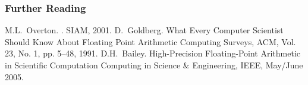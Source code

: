 \documentclass[mathserif,handout]{beamer}
\begin{document}
\begin{frame}[allowframebreaks]
  \frametitle<presentation>{Further Reading}    
  \begin{thebibliography}{10}    
  \beamertemplatebookbibitems
   M.L.~Overton.
    .
   \newblock SIAM, 2001.
    \beamertemplatearticlebibitems
 D.~Goldberg.
  \newblock What Every Computer Scientist Should Know About Floating Point Arithmetic
 \newblock Computing Surveys,  ACM, Vol. 23, No. 1, pp. 5--48, 1991.
 \beamertemplatearticlebibitems
 D.H.~Bailey.
  \newblock High-Precision Floating-Point Arithmetic in Scientific Computation
 \newblock Computing in Science \& Engineering,  IEEE, May/June 2005.
 \end{thebibliography}
\end{frame}
\end{document}
